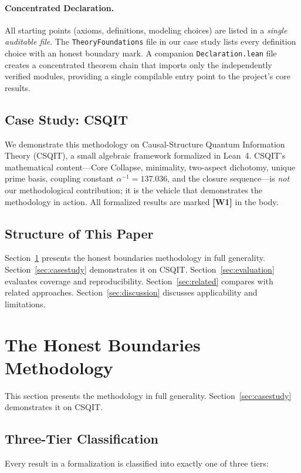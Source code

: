 ﻿\documentclass[11pt]{article}
\newcommand{\wone}[1]{\textcolor{wcolor}{\textbf{[#1]}}}
\begin{document}
\paragraph{Concentrated Declaration.} All starting points
(axioms, definitions, modeling choices) are listed in a
\emph{single auditable file}. The \texttt{TheoryFoundations}
file in our case study lists every definition choice with an
honest boundary mark. A companion \texttt{Declaration.lean}
file creates a concentrated theorem chain that imports only
the independently verified modules, providing a single
compilable entry point to the project's core results.

\subsection{Case Study: CSQIT}
We demonstrate this methodology on Causal-Structure Quantum
Information Theory (CSQIT), a small algebraic framework
formalized in Lean~4. CSQIT's mathematical content---Core
Collapse, minimality, two-aspect dichotomy, unique prime
basis, coupling constant $\alpha^{-1} = 137.036$, and the
closure sequence---is \emph{not} our methodological
contribution; it is the vehicle that demonstrates the
methodology in action. All formalized results are marked
\wone{W1} in the body.

\subsection{Structure of This Paper}
Section~\ref{sec:methodology} presents the honest boundaries
methodology in full generality. Section~\ref{sec:casestudy}
demonstrates it on CSQIT. Section~\ref{sec:evaluation} evaluates
coverage and reproducibility. Section~\ref{sec:related}
compares with related approaches. Section~\ref{sec:discussion}
discusses applicability and limitations.

\section{The Honest Boundaries Methodology}
\label{sec:methodology}

This section presents the methodology in full generality.
Section~\ref{sec:casestudy} demonstrates it on CSQIT.

\subsection{Three-Tier Classification}
Every result in a formalization is classified into exactly
one of three tiers:
\end{document}
